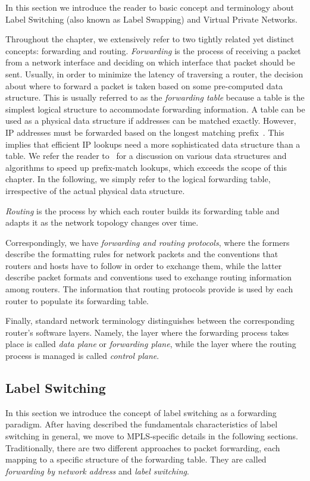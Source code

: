 \documentclass{article}
\begin{document}
In this section we introduce the reader to basic concept and terminology about 
Label Switching (also known as Label Swapping) and Virtual Private Networks.

Throughout the chapter, we extensively refer to two tightly related yet 
distinct concepts: forwarding and routing. \emph{Forwarding} is the process of receiving 
a packet from a network interface and deciding on which interface that packet 
should be sent. Usually, in order to minimize the latency of traversing a 
router, the decision about where to forward a packet is taken based on some 
pre-computed data structure. 
This is usually referred to as the \emph{forwarding table} because a table is 
the simplest logical structure to accommodate forwarding information. A table 
can be used as a physical data structure if addresses can be matched exactly. 
However, IP addresses must be forwarded based on the longest matching 
prefix~\cite{rfc4632}. This implies that efficient IP lookups need a more 
sophisticated data structure than a table. We refer the reader 
to~\cite{varghese} for a discussion on various data structures and algorithms to 
speed up prefix-match lookups, which exceeds the scope of this chapter. In the 
following, we simply refer to the logical forwarding table, irrespective of the 
actual physical data structure.

\emph{Routing} is the process by which each router builds its forwarding table 
and adapts it as the network topology changes over time.

Correspondingly, we have \emph{forwarding and routing protocols}, where the 
formers describe the formatting rules for network packets and the conventions 
that routers and hosts have to follow in order to exchange them, while the 
latter describe packet formats and conventions used to exchange routing 
information among routers. The information that routing protocols provide is 
used by each router to populate its forwarding table.

Finally, standard network terminology distinguishes between the corresponding 
router's software layers. Namely, the layer where the forwarding process takes 
place is called \emph{data plane} or \emph{forwarding plane}, while the layer 
where the routing process is managed is called \emph{control plane}.

%
%
\subsection{Label Switching}
In this section we introduce the concept of label switching as a 
forwarding paradigm. After having described the fundamentals characteristics of 
label switching in general, we move to MPLS-specific details in the following 
sections.
Traditionally, there are two different approaches to packet forwarding, each mapping to a
specific structure of the forwarding table. They are called \emph{forwarding by network
address} and \emph{label switching}.
\end{document}
